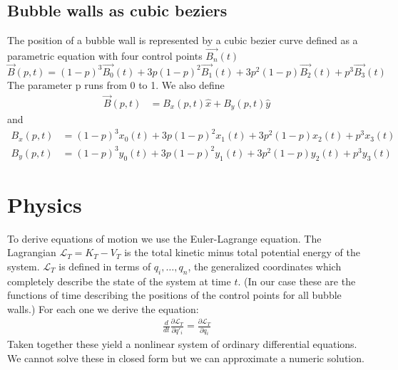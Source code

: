 \documentclass{article}
\begin{document}
\subsection{Bubble walls as cubic beziers}
The position of a bubble wall is represented by a cubic bezier curve defined as
a parametric equation with four control points $\vec{B_n}(t)$
\begin{displaymath}
\vec{B}(p,t)=(1-p)^3\vec{B_0}(t)+3p(1-p)^2\vec{B_1}(t)+3p^2(1-p)\vec{B_2}(t)+p^3\vec{B_3}(t)
\end{displaymath}
The parameter p runs from 0 to 1. We also define
\begin{align*}
\vec{B}(p,t)&=B_x(p,t)\hat{x} +B_y(p,t)\hat{y}
\end{align*}
and
\begin{align*}
B_x(p,t)&=(1-p)^3x_0(t)+3p(1-p)^2x_1(t)+3p^2(1-p)x_2(t)+p^3x_3(t)\\
B_y(p,t)&=(1-p)^3y_0(t)+3p(1-p)^2y_1(t)+3p^2(1-p)y_2(t)+p^3y_3(t)
\end{align*}
\section{Physics}
To derive equations of motion we use the Euler-Lagrange equation. The Lagrangian
$\mathcal{L}_T=K_T-V_T$ is the total kinetic minus total potential energy of the
system. $\mathcal{L}_T$ is defined in terms of $q_i,\dots,q_n$, the generalized coordinates
which completely describe the state of the system at time $t$. (In our case these are the
functions of time describing the positions of the control points
for all bubble walls.) For each one we derive the equation:
\begin{align*}
\frac{d}{d t}\frac{\partial \mathcal{L}_T}{\partial q'_i}
=\frac{\partial
\mathcal{L}_T}{\partial q_i} 
\end{align*} 
Taken together these yield a nonlinear system of ordinary differential
equations. We cannot solve these in closed form but we can approximate a numeric solution.
\end{document}

